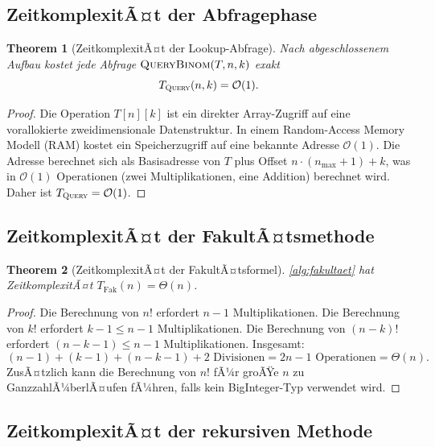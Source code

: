 ﻿\documentclass[12pt, a4paper]{article}
\newcommand{\Oh}{\mathcal{O}}
\newcommand{\query}{\textsc{Query}}
\theoremstyle{plain}
\newtheorem{theorem}{Theorem}[section]
\theoremstyle{definition}
\theoremstyle{remark}
\renewcommand{\Oh}{\mathcal{O}}
\renewcommand{\query}{\textsc{Query}}
\begin{document}
\subsection{ZeitkomplexitÃ¤t der Abfragephase}

\begin{theorem}[ZeitkomplexitÃ¤t der Lookup-Abfrage]
  \label{thm:lookup_zeit}
  Nach abgeschlossenem Aufbau kostet jede Abfrage
  $\textsc{QueryBinom}(T, n, k)$ exakt
  \begin{equation}
    T_{\query}(n, k) = \Oh(1).
    \label{eq:query_o1}
  \end{equation}
\end{theorem}

\begin{proof}
  Die Operation $T[n][k]$ ist ein direkter Array-Zugriff auf eine
  vorallokierte zweidimensionale Datenstruktur. In einem Random-Access
  Memory Modell (RAM) kostet ein Speicherzugriff auf eine bekannte Adresse
  $\Oh(1)$. Die Adresse berechnet sich als Basisadresse von $T$ plus
  Offset $n \cdot (n_{\max}+1) + k$, was in $\Oh(1)$ Operationen
  (zwei Multiplikationen, eine Addition) berechnet wird. Daher ist
  $T_{\query} = \Oh(1)$.
\end{proof}

\subsection{ZeitkomplexitÃ¤t der FakultÃ¤tsmethode}

\begin{theorem}[ZeitkomplexitÃ¤t der FakultÃ¤tsformel]
  \label{thm:fakultaet_zeit}
  \cref{alg:fakultaet} hat ZeitkomplexitÃ¤t $T_{\text{Fak}}(n) = \Theta(n)$.
\end{theorem}

\begin{proof}
  Die Berechnung von $n!$ erfordert $n-1$ Multiplikationen.
  Die Berechnung von $k!$ erfordert $k-1 \le n-1$ Multiplikationen.
  Die Berechnung von $(n-k)!$ erfordert $(n-k-1) \le n-1$
  Multiplikationen. Insgesamt:
  \begin{equation}
    (n-1) + (k-1) + (n-k-1) + 2 \text{ Divisionen}
    = 2n - 1 \text{ Operationen} = \Theta(n).
  \end{equation}
  ZusÃ¤tzlich kann die Berechnung von $n!$ fÃ¼r groÃŸe $n$ zu
  GanzzahlÃ¼berlÃ¤ufen fÃ¼hren, falls kein BigInteger-Typ verwendet wird.
\end{proof}

\subsection{ZeitkomplexitÃ¤t der rekursiven Methode}
\end{document}
